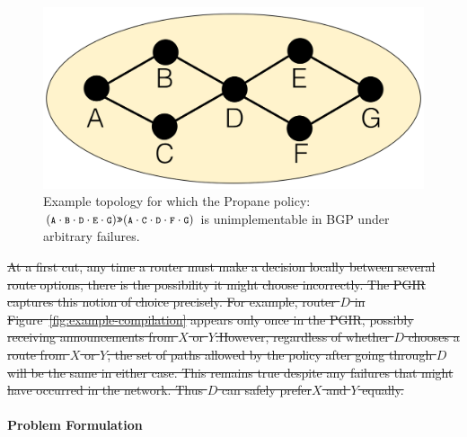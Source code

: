 \documentclass{sig-alternate-10pt}
\newcommand{\sysname}{{\small \sf Propane}\xspace}
\newcommand{\para}[1]{\paragraph*{\textbf{#1}}}
\newcommand{\CD}[1]{\texttt{\small #1}}  %
\newcommand{\Prefer}{\texttt{>>}}
\providecommand{\DIFdel}[1]{{\protect\color{red}\sout{#1}}}                      %
\providecommand{\DIFaddbegin}{} %
\providecommand{\DIFaddend}{} %
\providecommand{\DIFdelbegin}{} %
\providecommand{\DIFdelend}{} %
\begin{document}
\DIFaddbegin \begin{figure}[t!]
  \centering
  \includegraphics[width=.8\columnwidth]{figures/unimplementable}
  \caption{Example topology for which the \sysname policy: $(\CD{A} \cdot \CD{B} \cdot \CD{D} \cdot \CD{E} \cdot \CD{G}) \Prefer (\CD{A} \cdot \CD{C} \cdot \CD{D} \cdot \CD{F} \cdot \CD{G})$ is unimplementable in BGP under arbitrary failures.}
  \label{fig:unimplementable}
\end{figure}
\DIFaddend 


\DIFdelbegin \DIFdel{At a first cut, any time a router must make a decision locally between several route options, there is the possibility it might choose incorrectly. The PGIR captures this notion of choice precisely. For example, router $D$ in Figure~\ref{fig:example-compilation} appears only once in the PGIR, possibly receiving announcements from $X$ or $Y$.However, regardless of whether $D$ chooses a route from $X$ or $Y$, the set of paths allowed by the policy after going through $D$ will be the same in either case. This remains true despite any failures that might have occurred in the network. Thus $D$ can safely prefer$X$ and $Y$ equally.
}\DIFdelend \DIFaddbegin \para{Problem Formulation}
\DIFaddend 
\end{document}
